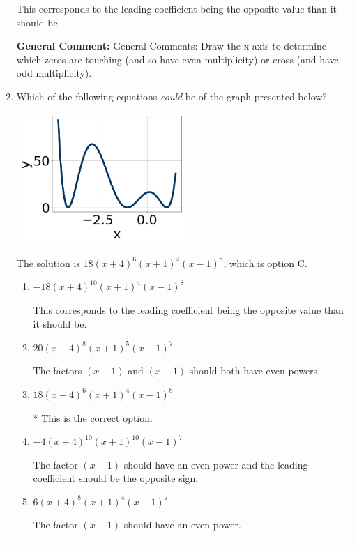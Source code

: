 \documentclass{extbook}[14pt]
\newcommand{\litem}[1]{\item #1

\rule{\textwidth}{0.4pt}}
\begin{document}
\begin{enumerate}
{\begin{enumerate}[label=\Alph*.]
This corresponds to the leading coefficient being the opposite value than it should be.
\end{enumerate}

\textbf{General Comment:} General Comments: Draw the x-axis to determine which zeros are touching (and so have even multiplicity) or cross (and have odd multiplicity).
}
\litem{
Which of the following equations \textit{could} be of the graph presented below?

\begin{center}
    \includegraphics[width=0.5\textwidth]{../Figures/polyGraphToFunctionCopyC.png}
\end{center}


The solution is \( 18(x + 4)^{6} (x + 1)^{4} (x - 1)^{8} \), which is option C.\begin{enumerate}[label=\Alph*.]
\item \( -18(x + 4)^{10} (x + 1)^{4} (x - 1)^{8} \)

This corresponds to the leading coefficient being the opposite value than it should be.
\item \( 20(x + 4)^{8} (x + 1)^{5} (x - 1)^{7} \)

The factors $(x + 1)$ and $(x - 1)$ should both have even powers.
\item \( 18(x + 4)^{6} (x + 1)^{4} (x - 1)^{8} \)

* This is the correct option.
\item \( -4(x + 4)^{10} (x + 1)^{10} (x - 1)^{7} \)

The factor $(x - 1)$ should have an even power and the leading coefficient should be the opposite sign.
\item \( 6(x + 4)^{8} (x + 1)^{4} (x - 1)^{7} \)

The factor $(x - 1)$ should have an even power.
\end{enumerate}

}
\end{enumerate}
\end{document}
